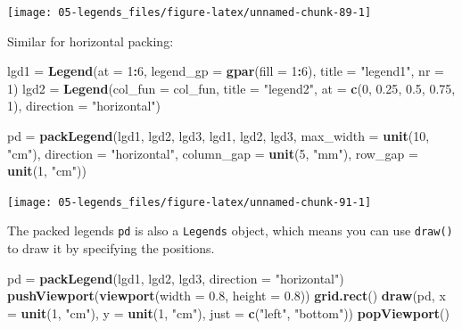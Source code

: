 \documentclass[]{book}
\newenvironment{Shaded}{\begin{snugshade}}{\end{snugshade}}
\newcommand{\KeywordTok}[1]{\textcolor[rgb]{0.13,0.29,0.53}{\textbf{#1}}}
\newcommand{\DataTypeTok}[1]{\textcolor[rgb]{0.13,0.29,0.53}{#1}}
\newcommand{\DecValTok}[1]{\textcolor[rgb]{0.00,0.00,0.81}{#1}}
\newcommand{\FloatTok}[1]{\textcolor[rgb]{0.00,0.00,0.81}{#1}}
\newcommand{\StringTok}[1]{\textcolor[rgb]{0.31,0.60,0.02}{#1}}
\newcommand{\OperatorTok}[1]{\textcolor[rgb]{0.81,0.36,0.00}{\textbf{#1}}}
\newcommand{\NormalTok}[1]{#1}
\theoremstyle{definition}
\theoremstyle{definition}
\theoremstyle{definition}
\theoremstyle{remark}
\begin{document}
\begin{center}\texttt{[image: 05-legends\_files/figure-latex/unnamed-chunk-89-1]} \end{center}

Similar for horizontal packing:

\begin{Shaded}
\begin{Highlighting}[]
\NormalTok{lgd1 =}\StringTok{ }\KeywordTok{Legend}\NormalTok{(}\DataTypeTok{at =} \DecValTok{1}\OperatorTok{:}\DecValTok{6}\NormalTok{, }\DataTypeTok{legend_gp =} \KeywordTok{gpar}\NormalTok{(}\DataTypeTok{fill =} \DecValTok{1}\OperatorTok{:}\DecValTok{6}\NormalTok{), }\DataTypeTok{title =} \StringTok{"legend1"}\NormalTok{,}
    \DataTypeTok{nr =} \DecValTok{1}\NormalTok{)}
\NormalTok{lgd2 =}\StringTok{ }\KeywordTok{Legend}\NormalTok{(}\DataTypeTok{col_fun =}\NormalTok{ col_fun, }\DataTypeTok{title =} \StringTok{"legend2"}\NormalTok{, }\DataTypeTok{at =} \KeywordTok{c}\NormalTok{(}\DecValTok{0}\NormalTok{, }\FloatTok{0.25}\NormalTok{, }\FloatTok{0.5}\NormalTok{, }\FloatTok{0.75}\NormalTok{, }\DecValTok{1}\NormalTok{),}
    \DataTypeTok{direction =} \StringTok{"horizontal"}\NormalTok{)}

\NormalTok{pd =}\StringTok{ }\KeywordTok{packLegend}\NormalTok{(lgd1, lgd2, lgd3, lgd1, lgd2, lgd3, }\DataTypeTok{max_width =} \KeywordTok{unit}\NormalTok{(}\DecValTok{10}\NormalTok{, }\StringTok{"cm"}\NormalTok{), }
    \DataTypeTok{direction =} \StringTok{"horizontal"}\NormalTok{, }\DataTypeTok{column_gap =} \KeywordTok{unit}\NormalTok{(}\DecValTok{5}\NormalTok{, }\StringTok{"mm"}\NormalTok{), }\DataTypeTok{row_gap =} \KeywordTok{unit}\NormalTok{(}\DecValTok{1}\NormalTok{, }\StringTok{"cm"}\NormalTok{))}
\end{Highlighting}
\end{Shaded}

\begin{center}\texttt{[image: 05-legends\_files/figure-latex/unnamed-chunk-91-1]} \end{center}

The packed legends \texttt{pd} is also a \texttt{Legends} object, which
means you can use \texttt{draw()} to draw it by specifying the
positions.

\begin{Shaded}
\begin{Highlighting}[]
\NormalTok{pd =}\StringTok{ }\KeywordTok{packLegend}\NormalTok{(lgd1, lgd2, lgd3, }\DataTypeTok{direction =} \StringTok{"horizontal"}\NormalTok{)}
\KeywordTok{pushViewport}\NormalTok{(}\KeywordTok{viewport}\NormalTok{(}\DataTypeTok{width =} \FloatTok{0.8}\NormalTok{, }\DataTypeTok{height =} \FloatTok{0.8}\NormalTok{))}
\KeywordTok{grid.rect}\NormalTok{()}
\KeywordTok{draw}\NormalTok{(pd, }\DataTypeTok{x =} \KeywordTok{unit}\NormalTok{(}\DecValTok{1}\NormalTok{, }\StringTok{"cm"}\NormalTok{), }\DataTypeTok{y =} \KeywordTok{unit}\NormalTok{(}\DecValTok{1}\NormalTok{, }\StringTok{"cm"}\NormalTok{), }\DataTypeTok{just =} \KeywordTok{c}\NormalTok{(}\StringTok{"left"}\NormalTok{, }\StringTok{"bottom"}\NormalTok{))}
\KeywordTok{popViewport}\NormalTok{()}
\end{Highlighting}
\end{Shaded}
\end{document}
